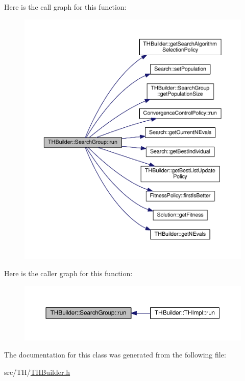 Here is the call graph for this function\+:\nopagebreak
\begin{figure}[H]
\begin{center}
\leavevmode
\includegraphics[width=350pt]{classTHBuilder_1_1SearchGroup_ac8c33d89ddd52e38fb23d7102d9086e0_cgraph}
\end{center}
\end{figure}




Here is the caller graph for this function\+:\nopagebreak
\begin{figure}[H]
\begin{center}
\leavevmode
\includegraphics[width=350pt]{classTHBuilder_1_1SearchGroup_ac8c33d89ddd52e38fb23d7102d9086e0_icgraph}
\end{center}
\end{figure}




The documentation for this class was generated from the following file\+:\begin{DoxyCompactItemize}
\item 
src/\+T\+H/\hyperlink{THBuilder_8h}{T\+H\+Builder.\+h}\end{DoxyCompactItemize}
